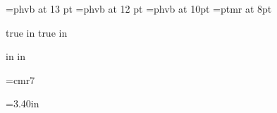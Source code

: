 
%






\typosize[9/10.5]
\font\titlefont =phvb at 13 pt
\font\headeronefont =phvb at 12 pt
\font\headertwofont =phvb at 10pt
\font\smallfont=ptmr at 8pt

\def\title#1{{\titlefont \vskip 0.02 in #1 \vskip 0.03 in}}
\def\headerone#1{{\vskip 0.02 in \headeronefont #1 \vskip 0.02 in}}
\def\headertwo#1{{\vskip 0.02 in \headertwofont #1 \vskip 0.02 in}}

 true in
 true in
\nopagenumbers

 in
 in
\hsize=10.6in
\vsize=8.0in
\parindent=0pt

\font\smallfont=cmr7
\sloppy


\def\strutA#1#2{\vrule height#1 depth#2 width0pt}

=3.40in
\raggedright

